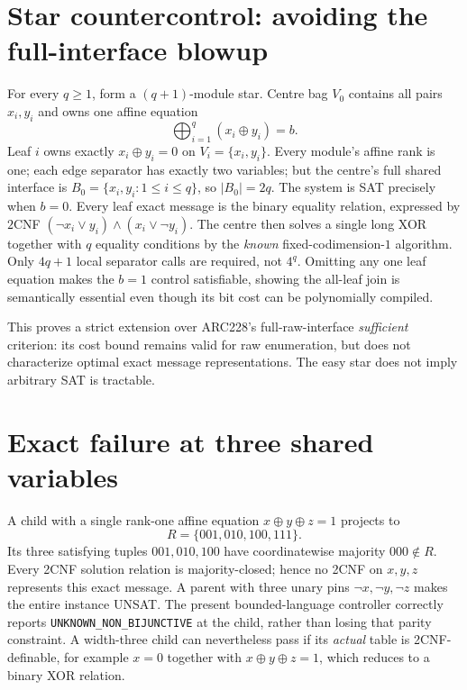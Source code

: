 \documentclass[11pt]{article}
\begin{document}
\section{Star countercontrol: avoiding the full-interface blowup}
For every $q\ge1$, form a $(q+1)$-module star.  Centre bag $V_0$ contains all pairs $x_i,y_i$ and owns one affine equation
\[
 \bigoplus_{i=1}^{q}(x_i\oplus y_i)=b.
\]
Leaf $i$ owns exactly $x_i\oplus y_i=0$ on $V_i=\{x_i,y_i\}$.  Every module's affine rank is one; each edge separator has exactly two variables; but the centre's full shared interface is $B_0=\{x_i,y_i:1\le i\le q\}$, so $|B_0|=2q$.  The system is SAT precisely when $b=0$.  Every leaf exact message is the binary equality relation, expressed by $2$CNF $(\neg x_i\lor y_i)\land(x_i\lor\neg y_i)$.  The centre then solves a single long XOR together with $q$ equality conditions by the \emph{known} fixed-codimension-$1$ algorithm.  Only $4q+1$ local separator calls are required, not $4^q$.  Omitting any one leaf equation makes the $b=1$ control satisfiable, showing the all-leaf join is semantically essential even though its bit cost can be polynomially compiled.

This proves a strict extension over ARC228's full-raw-interface \emph{sufficient} criterion: its cost bound remains valid for raw enumeration, but does not characterize optimal exact message representations.  The easy star does not imply arbitrary SAT is tractable.

\section{Exact failure at three shared variables}
A child with a single rank-one affine equation $x\oplus y\oplus z=1$ projects to
\[
 R=\{001,010,100,111\}.
\]
Its three satisfying tuples $001,010,100$ have coordinatewise majority $000\notin R$.  Every 2CNF solution relation is majority-closed; hence no 2CNF on $x,y,z$ represents this exact message.  A parent with three unary pins $\neg x,\neg y,\neg z$ makes the entire instance UNSAT.  The present bounded-language controller correctly reports \texttt{UNKNOWN\_NON\_BIJUNCTIVE} at the child, rather than losing that parity constraint.  A width-three child can nevertheless pass if its \emph{actual} table is 2CNF-definable, for example $x=0$ together with $x\oplus y\oplus z=1$, which reduces to a binary XOR relation.
\end{document}
